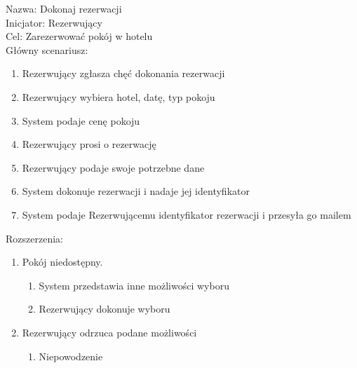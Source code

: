 \noindent Nazwa: Dokonaj rezerwacji\\
Inicjator: Rezerwujący\\
Cel: Zarezerwować pokój w hotelu\\
Główny scenariusz:
\begin{enumerate}[itemsep=0pt,partopsep=0pt, parsep=0pt]
    \item Rezerwujący zgłasza chęć dokonania rezerwacji
    \item Rezerwujący wybiera hotel, datę, typ pokoju
    \item System podaje cenę pokoju
    \item Rezerwujący prosi o rezerwację
    \item Rezerwujący podaje swoje potrzebne dane
    \item System dokonuje rezerwacji i nadaje jej identyfikator
    \item System podaje Rezerwującemu identyfikator rezerwacji i przesyła go mailem
\end{enumerate}
Rozszerzenia:
\begin{enumerate}[itemsep=0pt,partopsep=0pt, parsep=0pt]
    \item Pokój niedostępny.
    \begin{enumerate}[itemsep=0pt,partopsep=0pt, parsep=0pt]
        \item System przedstawia inne możliwości wyboru
        \item Rezerwujący dokonuje wyboru
    \end{enumerate}
    \item Rezerwujący odrzuca podane możliwości
    \begin{enumerate}[itemsep=0pt,partopsep=0pt, parsep=0pt]
        \item Niepowodzenie
    \end{enumerate}
\end{enumerate}
